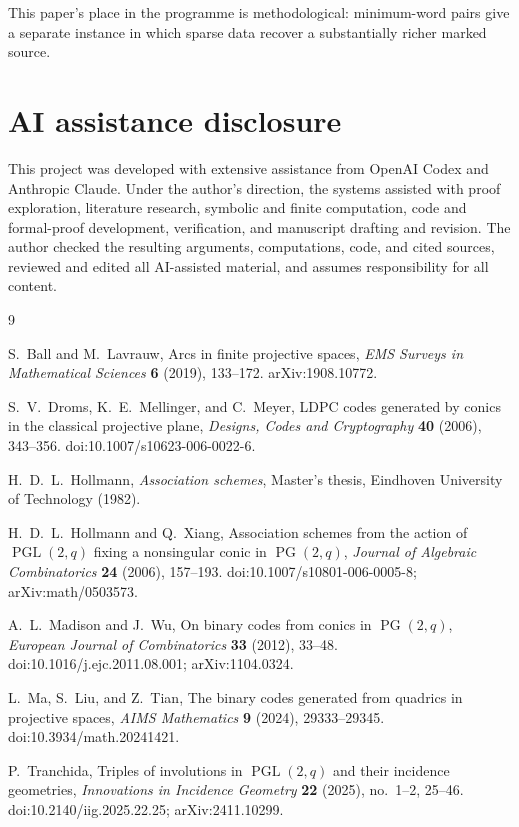 \documentclass[11pt]{article}
\theoremstyle{definition}
\theoremstyle{remark}
\newcommand{\PG}{\operatorname{PG}}
\newcommand{\PGL}{\operatorname{PGL}}
\begin{document}
This paper's place in the programme is methodological: minimum-word pairs give
a separate instance in which sparse data recover a substantially richer marked
source.

\section*{AI assistance disclosure}

This project was developed with extensive assistance from OpenAI Codex and
Anthropic Claude. Under the author's direction, the systems assisted with
proof exploration, literature research, symbolic and finite computation,
code and formal-proof development, verification, and manuscript drafting and
revision. The author checked the resulting arguments, computations, code,
and cited sources, reviewed and edited all AI-assisted material, and assumes
responsibility for all content.

\begin{thebibliography}{9}

S.~Ball and M.~Lavrauw,
\newblock Arcs in finite projective spaces,
\newblock \emph{EMS Surveys in Mathematical Sciences} \textbf{6} (2019),
133--172.
\newblock arXiv:1908.10772.

S.~V.~Droms, K.~E.~Mellinger, and C.~Meyer,
\newblock LDPC codes generated by conics in the classical projective plane,
\newblock \emph{Designs, Codes and Cryptography} \textbf{40} (2006),
343--356.
\newblock doi:10.1007/s10623-006-0022-6.

H.~D.~L.~Hollmann,
\newblock \emph{Association schemes},
\newblock Master's thesis, Eindhoven University of Technology (1982).

H.~D.~L.~Hollmann and Q.~Xiang,
\newblock Association schemes from the action of
\(\PGL(2,q)\) fixing a nonsingular conic in \(\PG(2,q)\),
\newblock \emph{Journal of Algebraic Combinatorics} \textbf{24} (2006),
157--193.
\newblock doi:10.1007/s10801-006-0005-8; arXiv:math/0503573.

A.~L.~Madison and J.~Wu,
\newblock On binary codes from conics in \(\PG(2,q)\),
\newblock \emph{European Journal of Combinatorics} \textbf{33} (2012),
33--48.
\newblock doi:10.1016/j.ejc.2011.08.001; arXiv:1104.0324.

L.~Ma, S.~Liu, and Z.~Tian,
\newblock The binary codes generated from quadrics in projective spaces,
\newblock \emph{AIMS Mathematics} \textbf{9} (2024), 29333--29345.
\newblock doi:10.3934/math.20241421.

P.~Tranchida,
\newblock Triples of involutions in \(\PGL(2,q)\) and their incidence
geometries,
\newblock \emph{Innovations in Incidence Geometry} \textbf{22} (2025),
no.~1--2, 25--46.
\newblock doi:10.2140/iig.2025.22.25; arXiv:2411.10299.

\end{thebibliography}
\end{document}
